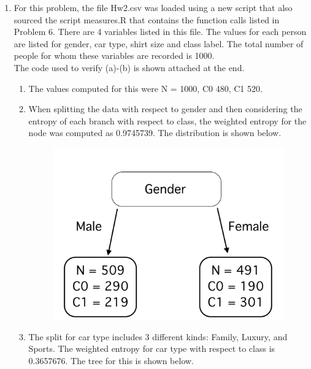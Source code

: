 \documentclass[11pt]{article}
\begin{document}
\begin{enumerate}
    \item For this problem, the file Hw2.csv was loaded using a new script that 
also sourced the script measures.R that contains the function calls listed in 
Problem 6. There are 4 variables listed in this file. The values for each 
person are listed for gender, car type, shirt size and class label. 
The total number of people for whom these variables are recorded is 1000. 
\\
The code used to verify (a)-(b) is shown attached at the end. 
      \begin{enumerate}
        \item The values computed for this were N = 1000, C0 480, C1 520. 
        \item When splitting the data with respect to gender and then considering the 
              entropy of each branch with respect to class, the weighted entropy for 
              the node was computed as 0.9745739. The distribution is shown below. 
          \begin{figure}[H]
          \begin{center}
          \includegraphics[scale=0.25]{genderclass}
          \end{center}
          \end{figure}
        \item The split for car type includes 3 different kinds: Family, Luxury, and Sports. 
              The weighted entropy for car type with respect to class is 0.3657676.
              The tree for this is shown below. 
          \begin{figure}[H]
          \begin{center}

\end{center}
\end{figure}
\end{enumerate}
\end{enumerate}
\end{document}
